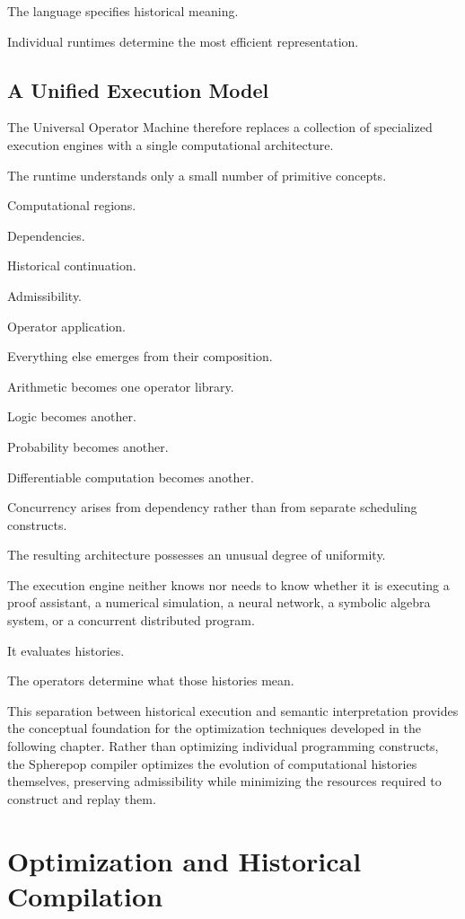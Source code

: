 \documentclass[12pt,oneside]{article}
\theoremstyle{definition}
\theoremstyle{remark}
\begin{document}
The language specifies historical meaning.

Individual runtimes determine the most efficient representation.

\subsection{A Unified Execution Model}

The Universal Operator Machine therefore replaces a collection of specialized
execution engines with a single computational architecture.

The runtime understands only a small number of primitive concepts.

Computational regions.

Dependencies.

Historical continuation.

Admissibility.

Operator application.

Everything else emerges from their composition.

Arithmetic becomes one operator library.

Logic becomes another.

Probability becomes another.

Differentiable computation becomes another.

Concurrency arises from dependency rather than from separate scheduling
constructs.

The resulting architecture possesses an unusual degree of uniformity.

The execution engine neither knows nor needs to know whether it is executing a
proof assistant, a numerical simulation, a neural network, a symbolic algebra
system, or a concurrent distributed program.

It evaluates histories.

The operators determine what those histories mean.

This separation between historical execution and semantic interpretation
provides the conceptual foundation for the optimization techniques developed
in the following chapter. Rather than optimizing individual programming
constructs, the Spherepop compiler optimizes the evolution of computational
histories themselves, preserving admissibility while minimizing the resources
required to construct and replay them.

\section{Optimization and Historical Compilation}
\end{document}
